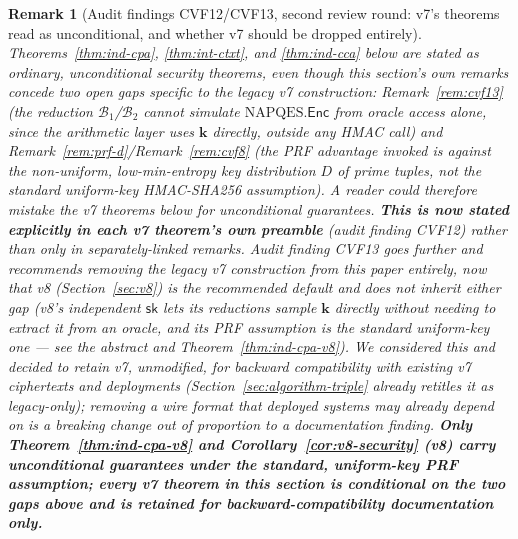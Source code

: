 \documentclass[11pt,a4paper]{article}
\newtheorem{remark}[theorem]{Remark}
\begin{document}
\begin{remark}[Audit findings CVF12/CVF13, second review round: v7's theorems read as unconditional, and whether v7 should be dropped entirely]
\label{rem:v2cvf12-13}
Theorems~\ref{thm:ind-cpa}, \ref{thm:int-ctxt}, and \ref{thm:ind-cca} below
are stated as ordinary, unconditional security theorems, even though this
section's own remarks concede two open gaps specific to the legacy v7
construction: Remark~\ref{rem:cvf13} (the reduction $\mathcal{B}_1$/$\mathcal{B}_2$
cannot simulate $\mathrm{NAPQES}.\mathsf{Enc}$ from oracle access alone,
since the arithmetic layer uses $\mathbf{k}$ directly, outside any HMAC
call) and Remark~\ref{rem:prf-d}/Remark~\ref{rem:cvf8} (the PRF advantage
invoked is against the non-uniform, low-min-entropy key distribution $D$
of prime tuples, not the standard uniform-key HMAC-SHA256 assumption). A
reader could therefore mistake the v7 theorems below for unconditional
guarantees. \textbf{This is now stated explicitly in each v7 theorem's
own preamble} (audit finding CVF12) rather than only in separately-linked
remarks. Audit finding CVF13 goes further and recommends removing the
legacy v7 construction from this paper entirely, now that v8
(Section~\ref{sec:v8}) is the recommended default and does not inherit
either gap (v8's independent $\mathsf{sk}$ lets its reductions sample
$\mathbf{k}$ directly without needing to extract it from an oracle, and
its PRF assumption is the standard uniform-key one --- see the abstract
and Theorem~\ref{thm:ind-cpa-v8}). We considered this and decided to
retain v7, unmodified, for backward compatibility with existing v7
ciphertexts and deployments (Section~\ref{sec:algorithm-triple} already
retitles it as legacy-only); removing a wire format that deployed systems
may already depend on is a breaking change out of proportion to a
documentation finding. \textbf{Only Theorem~\ref{thm:ind-cpa-v8} and
Corollary~\ref{cor:v8-security} (v8) carry unconditional guarantees under
the standard, uniform-key PRF assumption; every v7 theorem in this section
is conditional on the two gaps above and is retained for backward-compatibility
documentation only.}
\end{remark}
\end{document}
